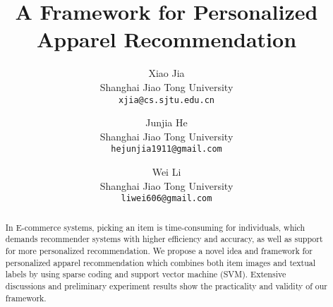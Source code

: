 \documentclass[a4paper]{article}
\title{A Framework for Personalized Apparel Recommendation}
\author{
Xiao Jia\\
        \small Shanghai Jiao Tong University\\
        \small \texttt{xjia@cs.sjtu.edu.cn}\\
\and
Junjia He\\
        \small Shanghai Jiao Tong University\\
        \small \texttt{hejunjia1911@gmail.com}\\
\and
Wei Li\\
        \small Shanghai Jiao Tong University\\
        \small \texttt{liwei606@gmail.com}\\
}
\date{}
\begin{document}
\maketitle

\begin{abstract}
In E-commerce systems, picking an item is time-consuming for individuals, which demands recommender systems with higher efficiency and accuracy, as well as support for more personalized recommendation. We propose a novel idea and framework for personalized apparel recommendation which combines both item images and textual labels by using sparse coding and support vector machine (SVM). Extensive discussions and preliminary experiment results show the practicality and validity of our framework.
\end{abstract}

















\end{document}
